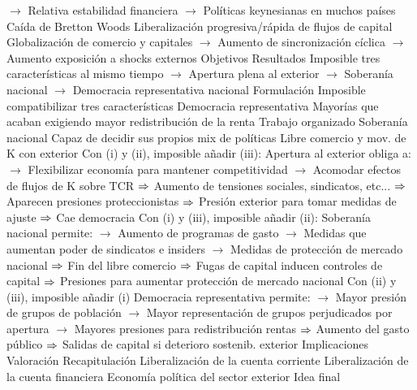 \documentclass{nuevotema}
\begin{document}
\begin{esquemal}
				\4[] $\to$ Relativa estabilidad financiera
				\4[] $\to$ Políticas keynesianas en muchos países
				\4[] Caída de Bretton Woods
				\4[] Liberalización progresiva/rápida de flujos de capital
				\4[] Globalización de comercio y capitales
				\4[] $\to$ Aumento de sincronización cíclica
				\4[] $\to$ Aumento exposición a shocks externos
				\4 Objetivos
				\4[]
				\4 Resultados
				\4[] Imposible tres características al mismo tiempo
				\4[] $\to$ Apertura plena al exterior
				\4[] $\to$ Soberanía nacional
				\4[] $\to$ Democracia representativa nacional
			\3 Formulación
				\4 Imposible compatibilizar tres características
				\4[i] Democracia representativa
				\4[] Mayorías que acaban exigiendo mayor redistribución de la renta
				\4[] Trabajo organizado
				\4[ii] Soberanía nacional
				\4[] Capaz de decidir sus propios mix de políticas
				\4[iii] Libre comercio y mov. de K con exterior
				\4 Con (i) y (ii), imposible añadir (iii):
				\4[] Apertura al exterior obliga a:
				\4[] $\to$ Flexibilizar economía para mantener competitividad
				\4[] $\to$ Acomodar efectos de flujos de K sobre TCR
				\4[] $\Rightarrow$ Aumento de tensiones sociales, sindicatos, etc...
				\4[] $\Rightarrow$ Aparecen presiones proteccionistas
				\4[] $\Rightarrow$ Presión exterior para tomar medidas de ajuste
				\4[] $\Rightarrow$ Cae democracia
				\4 Con (i) y (iii), imposible añadir (ii):
				\4[] Soberanía nacional permite:
				\4[] $\to$ Aumento de programas de gasto
				\4[] $\to$ Medidas que aumentan poder de sindicatos e insiders
				\4[] $\to$ Medidas de protección de mercado nacional
				\4[] $\Rightarrow$ Fin del libre comercio
				\4[] $\Rightarrow$ Fugas de capital inducen controles de capital
				\4[] $\Rightarrow$ Presiones para aumentar protección de mercado nacional
				\4 Con (ii) y (iii), imposible añadir (i)
				\4[] Democracia representativa permite:
				\4[] $\to$ Mayor presión de grupos de población
				\4[] $\to$ Mayor representación de grupos perjudicados por apertura
				\4[] $\to$ Mayores presiones para redistribución rentas
				\4[] $\Rightarrow$ Aumento del gasto público
				\4[] $\Rightarrow$ Salidas de capital si deterioro sostenib. exterior
			\3 Implicaciones
				\4
			\3 Valoración
	\1[] 
		\2 Recapitulación
			\3 Liberalización de la cuenta corriente
			\3 Liberalización de la cuenta financiera
			\3 Economía política del sector exterior
		\2 Idea final
\end{esquemal}
\end{document}
